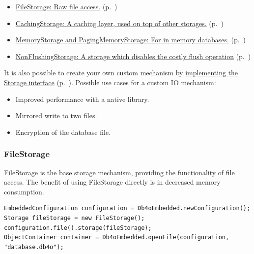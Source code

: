 \begin{itemize}
\item \hyperref[ref:configuration-file-storage-filestorage]{FileStorage: Raw file access.} (p.~\pageref{ref:configuration-file-storage-filestorage})
\item \hyperref[ref:configuration-file-storage-cachingstorage]{CachingStorage: A caching layer, used on top of other storages.} (p.~\pageref{ref:configuration-file-storage-cachingstorage})
\item \hyperref[ref:configuration-file-storage-memory-storage]{MemoryStorage and PagingMemoryStorage: For in memory databases.} (p.~\pageref{ref:configuration-file-storage-memory-storage})
\item \hyperref[ref:configuration-file-storage-nonflushingstorage]{NonFlushingStorage: A storage which disables the costly flush operation} (p.~\pageref{ref:configuration-file-storage-nonflushingstorage})
\end{itemize}

It is also possible to create your own custom mechanism by \hyperref[ref:configuration-file-storage-pluggable-storage]{implementing the Storage interface} (p.~\pageref{ref:configuration-file-storage-pluggable-storage}). Possible use cases for a custom IO mechanism:

\begin{itemize}
\item Improved performance with a native library.
\item Mirrored write to two files.
\item Encryption of the database file.
\end{itemize}

\subsubsection{FileStorage}
\label{ref:configuration-file-storage-filestorage}

FileStorage is the base storage mechanism, providing the functionality of file access. The benefit of using FileStorage directly is in decreased memory consumption.

\begin{lstlisting}
EmbeddedConfiguration configuration = Db4oEmbedded.newConfiguration();
Storage fileStorage = new FileStorage();
configuration.file().storage(fileStorage);
ObjectContainer container = Db4oEmbedded.openFile(configuration, "database.db4o");
\end{lstlisting}

